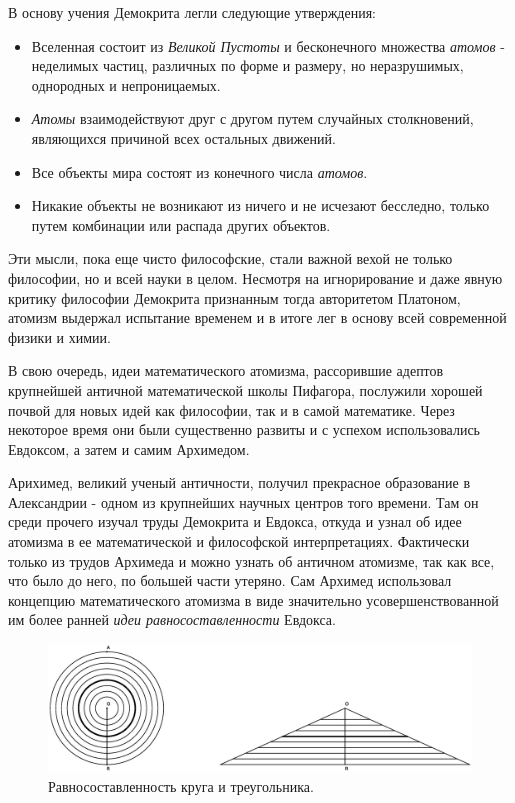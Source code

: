 В основу учения Демокрита легли следующие утверждения:
\begin{itemize}
    \item Вселенная состоит из \textit{Великой Пустоты} и бесконечного множества \textit{атомов} - неделимых частиц, различных по форме и размеру, но неразрушимых, однородных и непроницаемых.
    \item \textit{Атомы} взаимодействуют друг с другом путем случайных столкновений, являющихся причиной всех остальных движений. 
    \item Все объекты мира состоят из конечного числа \textit{атомов}.
    \item Никакие объекты не возникают из ничего и не исчезают бесследно, только путем комбинации или распада других объектов.
\end{itemize} 
Эти мысли, пока еще чисто философские, стали важной вехой не только философии, но и всей науки в целом.
Несмотря на игнорирование и даже явную критику философии Демокрита признанным тогда авторитетом Платоном, атомизм выдержал испытание временем и в итоге лег в основу всей современной физики и химии.

В свою очередь, идеи математического атомизма, рассорившие адептов крупнейшей античной математической школы Пифагора, послужили хорошей почвой для новых идей как философии, так и в самой математике.
Через некоторое время они были существенно развиты и с успехом использовались Евдоксом, а затем и самим Архимедом.

Арихимед, великий ученый античности, получил прекрасное образование в Александрии - одном из крупнейших научных центров того времени. 
Там он среди прочего изучал труды Демокрита и Евдокса, откуда и узнал об идее атомизма в ее математической и философской интерпретациях.
Фактически только из трудов Архимеда и можно узнать об античном атомизме, так как все, что было до него, по большей части утеряно.
Сам Архимед использовал концепцию математического атомизма в виде значительно усовершенствованной им более ранней \textit{идеи равносоставленности} Евдокса.

\begin{figure}[t!]
   \centering
   \includegraphics[scale=0.44]{images/archimed_1}
   \caption{Равносоставленность круга и треугольника.}
   \label{fig:archimed_1}
\end{figure}

